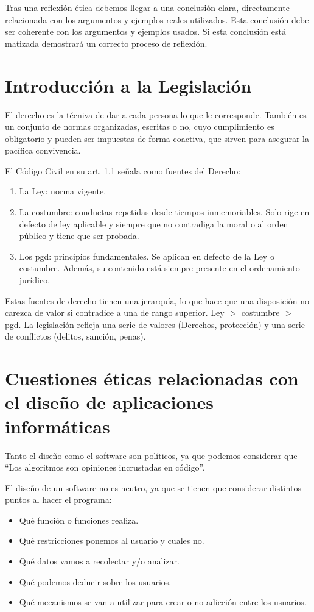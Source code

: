 Tras una reflexión ética debemos llegar a una conclusión clara, directamente relacionada con los argumentos y ejemplos reales utilizados. Esta conclusión debe ser coherente con los argumentos y ejemplos usados. Si esta conclusión está matizada demostrará un correcto proceso de reflexión.

\section{Introducción a la Legislación}
El derecho es la técniva de dar a cada persona lo que le corresponde. También es un conjunto de normas organizadas, escritas o no, cuyo cumplimiento es obligatorio y pueden ser impuestas de forma coactiva, que sirven para asegurar la pacífica convivencia.

El Código Civil en su art. 1.1 señala como fuentes del Derecho:
\begin{enumerate}
    \item La Ley: norma vigente.
    \item La costumbre: conductas repetidas desde tiempos inmemoriables. Solo rige en defecto de ley aplicable y siempre que no contradiga la moral o al orden público y tiene que ser probada.
    \item Los \gls{pgd}: principios fundamentales. Se aplican en defecto de la Ley o costumbre. Además, su contenido está siempre presente en el ordenamiento jurídico.
\end{enumerate}

Estas fuentes de derecho tienen una jerarquía, lo que hace que una disposición no carezca de valor si contradice a una de rango superior. Ley $>$ costumbre $>$ \gls{pgd}.
La legislación refleja una serie de valores (Derechos, protección) y una serie de conflictos (delitos, sanción, penas).
\section{Cuestiones éticas relacionadas con el diseño de aplicaciones informáticas}
Tanto el diseño como el software son políticos, ya que podemos considerar que ``Los algoritmos son opiniones incrustadas en código''.

El diseño de un software no es neutro, ya que se tienen que considerar distintos puntos al hacer el programa:
\begin{itemize}
    \item Qué función o funciones realiza.
    \item Qué restricciones ponemos al usuario y cuales no.
    \item Qué datos vamos a recolectar y/o analizar.
    \item Qué podemos deducir sobre los usuarios.
    \item Qué mecanismos se van a utilizar para crear o no adicción entre los usuarios.
\end{itemize}

